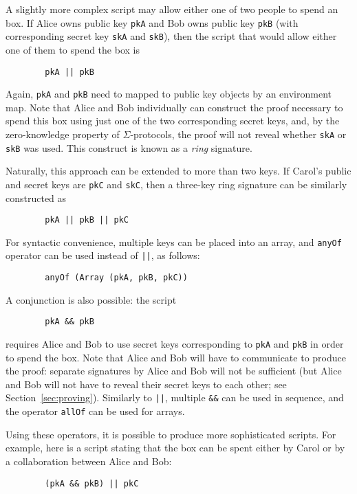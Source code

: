 \documentclass[11pt]{article}
\begin{document}
A slightly more complex script may allow either one of two people to spend an box. If Alice owns public key \texttt{pkA}  and Bob owns public key \texttt{pkB} (with corresponding secret key \texttt{skA} and \texttt{skB}), then the script that would allow either one of them to spend the box is
\begin{verbatim}
        pkA || pkB
\end{verbatim}
Again, \texttt{pkA} and \texttt{pkB} need to mapped to public key objects by an environment map.
Note that Alice and Bob individually can construct the proof necessary to spend this box using just one of the two corresponding secret keys, and, by the zero-knowledge property of $\Sigma$-protocols, the proof will not reveal whether \texttt{skA} or \texttt{skB} was used. This construct is known as a \emph{ring} signature.

Naturally, this approach can be extended to more than two keys. If Carol's public and secret keys are \texttt{pkC} and \texttt{skC}, then a three-key ring signature can be similarly constructed as
\begin{verbatim}
        pkA || pkB || pkC
\end{verbatim}
	
For syntactic convenience, multiple keys can be placed into an array, and \texttt{anyOf} operator can be used instead of \texttt{||}, as follows:
\begin{verbatim}
        anyOf (Array (pkA, pkB, pkC))
\end{verbatim}

A conjunction is also possible: the script
\begin{verbatim}
        pkA && pkB
\end{verbatim}
requires Alice and Bob to use secret keys corresponding to \texttt{pkA} and \texttt{pkB} in order to spend the box. Note that Alice and Bob will have to communicate to produce the proof: separate signatures by Alice and Bob will not be sufficient (but Alice and Bob will not have to reveal their secret keys to each other; see Section~\ref{sec:proving}). Similarly to \texttt{||}, multiple \texttt{\&\&} can be used in sequence, and the operator \texttt{allOf} can be used for arrays.


Using these operators, it is possible to produce more sophisticated scripts. For example, here is a script stating that the box can be spent either by Carol or by a collaboration between Alice and Bob:

\begin{verbatim}
        (pkA && pkB) || pkC
\end{verbatim}
\end{document}
